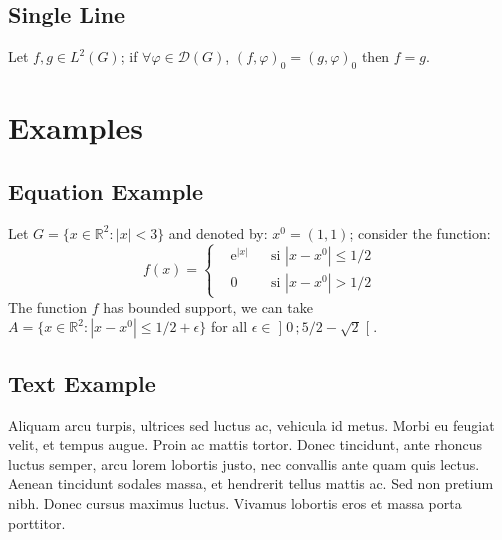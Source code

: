 \documentclass[
	11pt, %
	fleqn, %
	a4paper, %
]{LegrandOrangeBook}
\begin{document}
\subsection{Single Line}

\begin{proposition} %
	Let $f,g\in L^2(G)$; if $\forall \varphi\in\mathcal{D}(G)$, $(f,\varphi)_0=(g,\varphi)_0$ then $f = g$. 
\end{proposition}


\section{Examples}

\subsection{Equation Example}

\begin{example} %
	Let $G=\{x\in\mathbb{R}^2:|x|<3\}$ and denoted by: $x^0=(1,1)$; consider the function:
	\begin{equation}
	f(x)=\left\{\begin{aligned} & \mathrm{e}^{|x|} & & \text{si $|x-x^0|\leq 1/2$}\\
	& 0 & & \text{si $|x-x^0|> 1/2$}\end{aligned}\right.
	\end{equation}
	The function $f$ has bounded support, we can take $A=\{x\in\mathbb{R}^2:|x-x^0|\leq 1/2+\epsilon\}$ for all $\epsilon\in\mathopen{]}0\,;5/2-\sqrt{2}\mathclose{[}$.
\end{example}

\subsection{Text Example}

\begin{example}[Example name] %
	Aliquam arcu turpis, ultrices sed luctus ac, vehicula id metus. Morbi eu feugiat velit, et tempus augue. Proin ac mattis tortor. Donec tincidunt, ante rhoncus luctus semper, arcu lorem lobortis justo, nec convallis ante quam quis lectus. Aenean tincidunt sodales massa, et hendrerit tellus mattis ac. Sed non pretium nibh. Donec cursus maximus luctus. Vivamus lobortis eros et massa porta porttitor.
\end{example}
\end{document}
